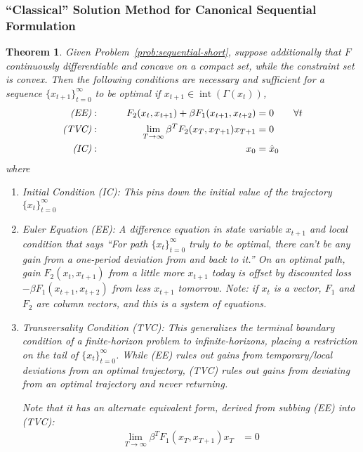 \documentclass[12pt]{article}
\numberwithin{equation}{section} %
\theoremstyle{plain}
\newtheorem{thm}{Theorem}[section]
\theoremstyle{definition}
\theoremstyle{remark}
\newcommand{\ra}{\rightarrow}
\newcommand{\interior}{\operatorname{int}}
\newcommand{\tinfz}{_{t=0}^\infty}
\begin{document}
\clearpage
\subsubsection{``Classical'' Solution Method for Canonical Sequential
Formulation}

\begin{thm}
Given Problem~\ref{prob:sequential-short}, suppose additionally that $F$
continuously differentiable and concave on a compact set, while the
constraint set is convex.
Then the following conditions are necessary and sufficient for a
sequence $\{x_{t+1}\}\tinfz$ to be optimal if $x_{t+1}\in
\interior(\Gamma(x_t))$,
\begin{alignat*}{3}
  \text{\emph{(EE)}}:&&
  \qquad
  F_2(x_{t},x_{t+1}) + \beta F_1(x_{t+1},x_{t+2})
  &= 0
  \qquad\forall t
  \\
  \text{\emph{(TVC)}}:&&
  \lim_{T\ra\infty}
  \beta^T F_2(x_{T},x_{T+1})
  x_{T+1}
  &= 0
  \\
  \text{\emph{(IC)}}:&&
  x_0 &= \hat{x}_0
\end{alignat*}
where
\begin{enumerate}[label=\emph{(\roman*)}]
  \item \emph{Initial Condition (IC):} This pins down the initial value
    of the trajectory $\{x_t\}\tinfz$
  \item \emph{Euler Equation (EE):}
    A difference equation in state variable $x_{t+1}$ and local
    condition that says ``For path $\{x_t\}\tinfz$ truly to be optimal,
    there can't be any gain from a one-period deviation from and back to
    it.''
    On an optimal path, gain $F_2(x_t,x_{t+1})$ from a little more
    $x_{t+1}$ today is offset by discounted loss $-\beta
    F_1(x_{t+1},x_{t+2})$ from less $x_{t+1}$ tomorrow.
    Note: if $x_t$ is a vector, $F_1$ and $F_2$ are column vectors, and
    this is a system of equations.

  \item \emph{Transversality Condition (TVC):}
    This generalizes the \emph{terminal boundary condition} of a
    finite-horizon problem to infinite-horizons, placing a
    restriction on the tail of $\{x_t\}\tinfz$.
    While (EE) rules out gains from temporary/local deviations from an
    optimal trajectory, (TVC) rules out gains from deviating from an
    optimal trajectory and \emph{never returning}.

    Note that it has an alternate equivalent form, derived from subbing
    (EE) into (TVC):
      \begin{align*}
        \lim_{T\ra\infty}
        \beta^{T}
        F_1(x_{T},x_{T+1})
        x_{T}
        &= 0
      \end{align*}
\end{enumerate}
\end{thm}
\end{document}
